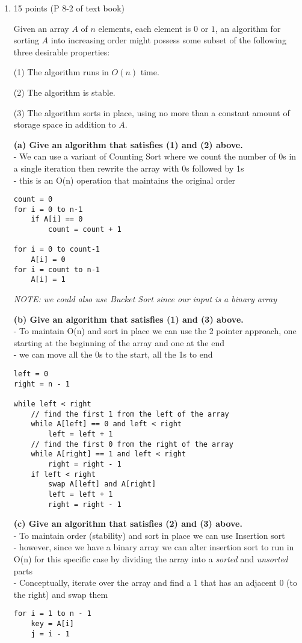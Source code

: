 \documentclass[letterpaper,12pt]{article}
\begin{document}
\begin{enumerate}
\noindent\rule{16cm}{0.1pt}

\item 15 points (P 8-2 of text book) 

Given an array $A$ of $n$ elements, each element is $0$ or $1$, an algorithm for
sorting $A$ into increasing order might possess some subset of the following three
desirable properties:

(1) The algorithm runs in $O(n)$ time.

(2) The algorithm is stable.

(3) The algorithm sorts in place, using no more than a constant amount of storage
space in addition to $A$.

\textbf{(a) Give an algorithm that satisfies (1) and (2) above.} \\
- We can use a variant of Counting Sort where we count the number of 0s in a single iteration then rewrite the array with 0s followed by 1s \\
- this is an O(n) operation that maintains the original order
\begin{verbatim}
count = 0
for i = 0 to n-1
    if A[i] == 0
        count = count + 1

for i = 0 to count-1
    A[i] = 0
for i = count to n-1
    A[i] = 1
\end{verbatim}
\textit{NOTE: we could also use Bucket Sort since our input is a binary array}

\textbf{(b) Give an algorithm that satisfies (1) and (3) above.} \\
- To maintain O(n) and sort in place we can use the 2 pointer approach, one starting at the beginning of the array and one at the end \\
- we can move all the 0s to the start, all the 1s to end
\begin{verbatim}
left = 0
right = n - 1

while left < right
    // find the first 1 from the left of the array
    while A[left] == 0 and left < right
        left = left + 1
    // find the first 0 from the right of the array
    while A[right] == 1 and left < right
        right = right - 1
    if left < right
        swap A[left] and A[right]
        left = left + 1
        right = right - 1
\end{verbatim}

\textbf{(c) Give an algorithm that satisfies (2) and (3) above.} \\
- To maintain order (stability) and sort in place we can use Insertion sort \\
- however, since we have a binary array we can alter insertion sort to run in O(n) for this specific case by dividing the array into a \textit{sorted} and \textit{unsorted} parts \\
- Conceptually, iterate over the array and find a 1 that has an adjacent 0 (to the right) and swap them
\begin{verbatim}
for i = 1 to n - 1
    key = A[i]
    j = i - 1


\end{verbatim}
\end{enumerate}
\end{document}
